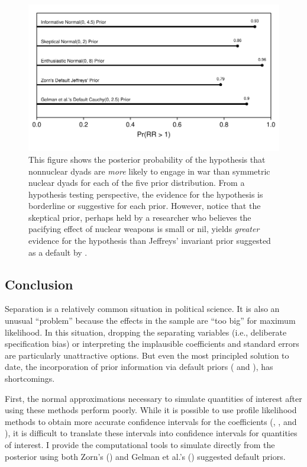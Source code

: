 \documentclass[12pt]{article}
\begin{document}
\begin{figure}[H]
\begin{center}
\includegraphics[scale = .8]{figs/bm-pr-hypothesis.pdf}
\caption{This figure shows the posterior probability of the hypothesis that nonnuclear dyads are \emph{more} likely to engage in war than symmetric nuclear dyads for each of the five prior distribution. 
From a hypothesis testing perspective, the evidence for the hypothesis is borderline or suggestive for each prior. 
However, notice that the skeptical prior, perhaps held by a researcher who believes the pacifying effect of nuclear weapons is small or nil, yields \emph{greater} evidence for the hypothesis than Jeffreys' invariant prior suggested as a default by \cite{Zorn2005}.}\label{fig:bm-pr-hypothesis}
\end{center}
\end{figure}

\subsection*{Conclusion}

Separation is a relatively common situation in political science. 
It is also an unusual ``problem'' because the effects in the sample are ``too big'' for maximum likelihood. 
In this situation, dropping the separating variables (i.e., deliberate specification bias) or interpreting the implausible coefficients and standard errors are particularly unattractive options. 
But even the most principled solution to date, the incorporation of prior information via default priors (\citealt{Zorn2005} and \citealt{Gelmanetal2008}), has shortcomings.

First, the normal approximations necessary to simulate quantities of interest after using these methods perform poorly. 
While it is possible to use profile likelihood methods to obtain more accurate confidence intervals for the coefficients (\citealt{Zorn2005}, \citealt{HeinzeSchemper2002}, and \citealt{McCullaghNelder1989}), it is difficult to translate these intervals into confidence intervals for quantities of interest. 
I provide the computational tools to simulate directly from the posterior using both Zorn's (\citeyear{Zorn2005}) and Gelman et al.'s (\citeyear{Gelmanetal2008}) suggested default priors.
\end{document}
